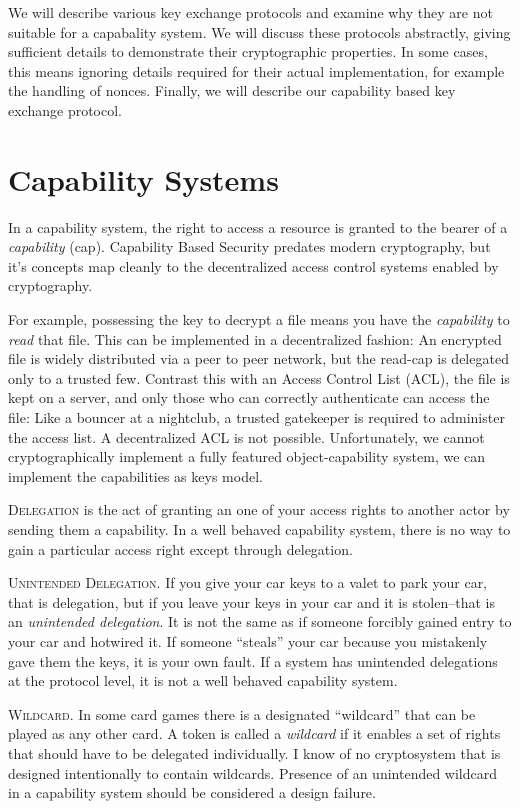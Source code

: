 \documentclass[12pt]{article}
\begin{document}
We will describe various key exchange protocols and examine why they
are not suitable for a capabality system. We will discuss these
protocols abstractly, giving sufficient details to demonstrate their
cryptographic properties. In some cases, this means ignoring details
required for their actual implementation, for example the handling of
nonces. Finally, we will describe our capability based key exchange
protocol.

\section{Capability Systems}

In a capability system, the right to access a resource is granted
to the bearer of a \emph{capability} (cap). Capability
Based Security predates modern cryptography, but it's concepts
map cleanly to the decentralized access control systems
enabled by cryptography.

For example, possessing the key to decrypt a file means you have
the \emph{capability} to \emph{read} that file. This can be implemented
in a decentralized fashion: An encrypted file is widely distributed
via a peer to peer network, but the read-cap is delegated
only to a trusted few.  Contrast this with an Access
Control List (ACL), the file is kept on a server, and only those
who can correctly authenticate can access the file: Like a bouncer
at a nightclub, a trusted gatekeeper is required to administer the
access list. A decentralized ACL is not possible.
Unfortunately, we cannot cryptographically implement a fully featured
object-capability system, we can implement
the capabilities as keys\cite{capmyths} model.


\textsc{Delegation} is the act of granting an one of your access
rights to another actor by sending them a capability.
In a well behaved capability system, there is no way to gain a
particular access right except through delegation.

\textsc{Unintended Delegation}. If you give your car keys to a valet
to park your car, that is delegation, but if you leave your keys in your
car and it is stolen--that is an \emph{unintended delegation}.
It is not the same as if someone forcibly gained entry to your car
and hotwired it. If someone ``steals'' your car because you mistakenly
gave them the keys, it is your own fault. If a system has unintended
delegations at the protocol level, it is not a well behaved capability
system.

\textsc{Wildcard}. In some card games there is a designated ``wildcard''
that can be played as any other card. A token is called a \emph{wildcard}
if it enables a set of rights that should have to be delegated
individually.
I know of no cryptosystem that is designed intentionally to contain
wildcards. Presence of an unintended wildcard in a capability
system should be considered a design failure.
\end{document}
